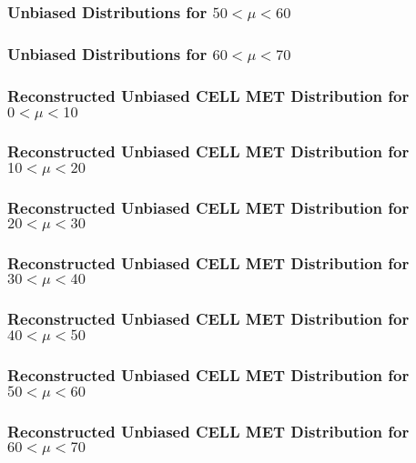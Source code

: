 \documentclass[]{beamer}
\begin{document}
\begin{frame}
        \frametitle{Unbiased Distributions for $50<\mu<60$}
\end{frame}
\begin{frame}
        \frametitle{Unbiased Distributions for $60<\mu<70$}
\end{frame}
\begin{frame}
        \frametitle{Reconstructed Unbiased CELL MET Distribution for $0<\mu<10$}
\end{frame}
\begin{frame}
        \frametitle{Reconstructed Unbiased CELL MET Distribution for $10<\mu<20$}
\end{frame}
\begin{frame}
        \frametitle{Reconstructed Unbiased CELL MET Distribution for $20<\mu<30$}
\end{frame}
\begin{frame}
        \frametitle{Reconstructed Unbiased CELL MET Distribution for $30<\mu<40$}
\end{frame}
\begin{frame}
        \frametitle{Reconstructed Unbiased CELL MET Distribution for $40<\mu<50$}
\end{frame}
\begin{frame}
        \frametitle{Reconstructed Unbiased CELL MET Distribution for $50<\mu<60$}
\end{frame}
\begin{frame}
        \frametitle{Reconstructed Unbiased CELL MET Distribution for $60<\mu<70$}
\end{frame}

\end{document}
